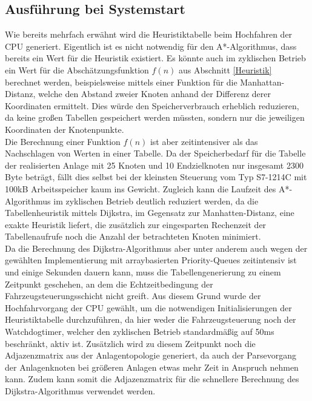 	
		\subsection{Ausführung bei Systemstart}
			
			Wie bereits mehrfach erwähnt wird die Heuristiktabelle beim Hochfahren der CPU generiert. Eigentlich ist es nicht notwendig für den A*-Algorithmus, dass bereits ein Wert für die Heuristik existiert. Es könnte auch im zyklischen Betrieb ein Wert für die Abschätzungsfunktion $f(n)$ aus Abschnitt \ref{Heuristik} berechnet werden, beispielsweise mittels einer Funktion für die Manhattan-Distanz, welche den Abstand zweier Knoten anhand der Differenz derer Koordinaten ermittelt. Dies würde den Speicherverbrauch erheblich reduzieren, da keine großen Tabellen gespeichert werden müssten, sondern nur die jeweiligen Koordinaten der Knotenpunkte.
			\\[4pt]
			Die Berechnung einer Funktion $f(n)$ ist aber zeitintensiver als das Nachschlagen von Werten in einer Tabelle. Da der Speicherbedarf für die Tabelle der realisierten Anlage mit 25 Knoten und 10 Endzielknoten nur insgesamt 2300 Byte beträgt, fällt dies selbst bei der kleinsten Steuerung vom Typ S7-1214C mit 100kB Arbeitsspeicher kaum ins Gewicht. Zugleich kann die Laufzeit des A*-Algorithmus im zyklischen Betrieb deutlich reduziert werden, da die Tabellenheuristik mittels Dijkstra, im Gegensatz zur Manhatten-Distanz, eine exakte Heuristik liefert, die zusätzlich zur eingesparten Rechenzeit der Tabellenaufrufe noch die Anzahl der betrachteten Knoten minimiert.
			\\[4pt]
			Da die Berechnung des Dijkstra-Algorithmus aber unter anderem auch wegen der gewählten Implementierung mit arraybasierten Priority-Queues zeitintensiv ist \cite{BorisCherkassky1993} und einige Sekunden dauern kann, muss die Tabellengenerierung zu einem Zeitpunkt geschehen, an dem die Echtzeitbedingung der Fahrzeugsteuerungsschicht nicht greift. Aus diesem Grund wurde der Hochfahrvorgang der CPU gewählt, um die notwendigen Initialisierungen der Heuristiktabelle durchzuführen, da hier weder die Fahrzeugsteuerung noch der Watchdogtimer, welcher den zyklischen Betrieb standardmäßig auf 50ms beschränkt, aktiv ist. Zusätzlich wird zu diesem Zeitpunkt noch die Adjazenzmatrix aus der Anlagentopologie generiert, da auch der Parsevorgang der Anlagenknoten bei größeren Anlagen etwas mehr Zeit in Anspruch nehmen kann. Zudem kann somit die Adjazenzmatrix für die schnellere Berechnung des Dijkstra-Algorithmus verwendet werden.
				
